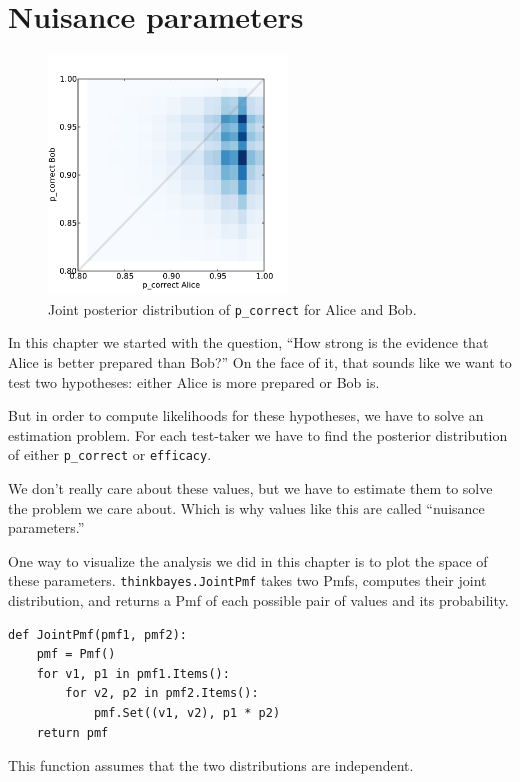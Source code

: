 \documentclass[12pt]{book}
\begin{document}
\section{Nuisance parameters}

\begin{figure}
\centerline{\includegraphics[height=2.5in]{figs/sat_joint.pdf}}
\caption{Joint posterior distribution of {\tt p\_correct} for Alice and Bob.}
\label{fig.satjoint}
\end{figure}

In this chapter we started with the question,
``How strong is the evidence that Alice is better prepared
than Bob?''  On the face of it, that sounds like we want to
test two hypotheses: either Alice is more prepared or Bob is.

But in order to compute likelihoods for these hypotheses, we
have to solve an estimation problem.  For each test-taker
we have to find the posterior distribution of either
\verb"p_correct" or \verb"efficacy".

We don't really care about these values, but we have
to estimate them to solve the problem we care about.  Which
is why values like this are called ``nuisance parameters.''

One way to visualize the analysis we did in this chapter is
to plot the space of these parameters.  \verb"thinkbayes.JointPmf"
takes two Pmfs, computes their joint distribution, and returns
a Pmf of each possible pair of values and its probability.

\begin{verbatim}
def JointPmf(pmf1, pmf2):
    pmf = Pmf()
    for v1, p1 in pmf1.Items():
        for v2, p2 in pmf2.Items():
            pmf.Set((v1, v2), p1 * p2)
    return pmf
\end{verbatim}

This function assumes that the two distributions are independent.
\end{document}
